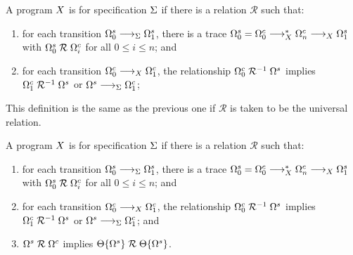 \begin{definition}
  A program $X$ is  for specification $\Sigma$ if there is a relation $\mathrel{\mathcal{R}}$ such that:
  \begin{enumerate}
  \item\label{def:spec-pres-1}
    for each transition $\octx^s_0 \trans_{\spec} \octx^s_1$,
    there is a trace $\octx^s_0 = \octx^c_0 \trans*_{\chor} \octx^c_n \trans_{\chor} \octx^s_1$ with $\Omega^s_0 \mathrel{\mathcal{R}} \Omega^c_i$ for all $0 \leq i \leq n$; and
  \item\label{def:spec-pres-2}
    for each transition $\octx^c_0 \trans_{\chor} \octx^c_1$,
    the relationship $\Omega^c_0 \mathrel{\mathcal{R}^{-1}} \Omega^s$ implies $\Omega^c_1 \mathrel{\mathcal{R}^{-1}} \Omega^s$ or $\octx^s \trans_{\spec} \octx^c_1$;
  \end{enumerate}
\end{definition}
\noindent
This definition is the same as the previous one if $\mathrel{\mathcal{R}}$ is taken to be the universal relation.



\begin{definition}
  A program $X$ is  for specification $\Sigma$ if there is a relation $\mathrel{\mathcal{R}}$ such that:
  \begin{enumerate}
  \item\label{def:spec-pres-1}
    for each transition $\octx^s_0 \trans_{\spec} \octx^s_1$,
    there is a trace $\octx^s_0 = \octx^c_0 \trans*_{\chor} \octx^c_n \trans_{\chor} \octx^s_1$ with $\Omega^s_0 \mathrel{\mathcal{R}} \Omega^c_i$ for all $0 \leq i \leq n$; and
  \item\label{def:spec-pres-2}
    for each transition $\octx^c_0 \trans_{\chor} \octx^c_1$,
    the relationship $\Omega^c_0 \mathrel{\mathcal{R}^{-1}} \Omega^s$ implies $\Omega^c_1 \mathrel{\mathcal{R}^{-1}} \Omega^s$ or $\octx^s \trans_{\spec} \octx^c_1$; and
  \item
    $\Omega^s \mathrel{\mathcal{R}} \Omega^c$ implies $\ofill{\octx^s} \mathrel{\mathcal{R}} \ofill{\octx^s}$.
  \end{enumerate}
\end{definition}



